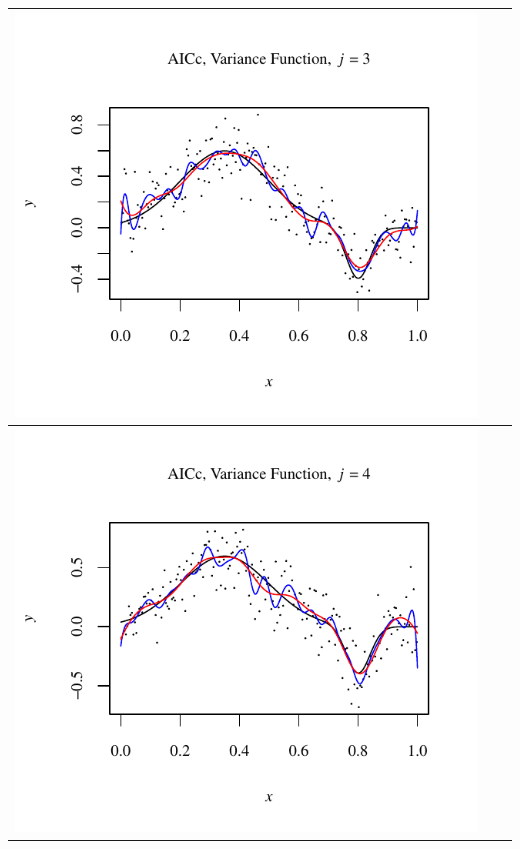 \documentclass[11pt]{article}
\begin{document}
\begin{table}[h!]
\begin{center}
\begin{tabular}{| >{\centering\arraybackslash}m{2.1in} |  >{\centering\arraybackslash}m{2.1in} |  >{\centering\arraybackslash}m{2.1in}|}
      \includegraphics[width=1\linewidth,height=0.18\textheight]{Graphs/3/4/assignment5_a_3_4_3}\\\hline
      \includegraphics[width=1\linewidth,height=0.18\textheight]{Graphs/3/4/assignment5_a_3_4_4}&

\end{tabular}
\end{center}
\end{table}
\end{document}
